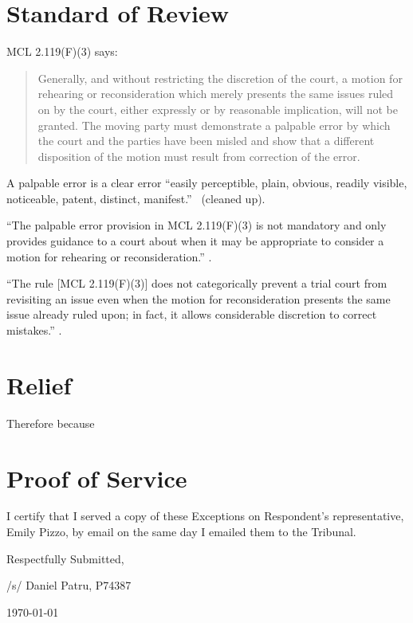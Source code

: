 \documentclass[12pt,\documentclassflag]{michiganCourtOfAppealsBrief}
\begin{document}
\section{Standard of Review}

MCL 2.119(F)(3) says:

\begin{quote}
  Generally, and without restricting the discretion of the court, a motion for rehearing or reconsideration which merely presents the same issues ruled on by the court, either expressly or by reasonable implication, will not be granted. The moving party must demonstrate a palpable error by which the court and the parties have been misled and show that a different disposition of the motion must result from correction of the error.
\end{quote}

 A palpable error is a clear error ``easily perceptible, plain, obvious, readily
 visible, noticeable, patent, distinct, manifest.'' \ (cleaned up).
 
``The palpable error provision in MCL 2.119(F)(3)  is not mandatory and only provides guidance to
a court about when it may be appropriate to consider a motion for rehearing or reconsideration.''
.

``The rule [MCL 2.119(F)(3)] does not categorically prevent a trial court from revisiting an issue even when the motion for reconsideration presents the same issue already ruled upon; in fact, it allows considerable discretion to correct mistakes.'' . 








\section{Relief}

Therefore because


\section{Proof of Service}

I certify that I served a copy of these Exceptions on Respondent's representative, Emily Pizzo, by email on the same day I emailed them to the Tribunal.

\vspace{1\baselineskip}

{ \setlength{\leftskip}{3.5in}

  Respectfully Submitted,

  /s/ Daniel Patru, P74387

\today

  \setlength{\leftskip}{0pt}}

\newpage\empty%
\end{document}
